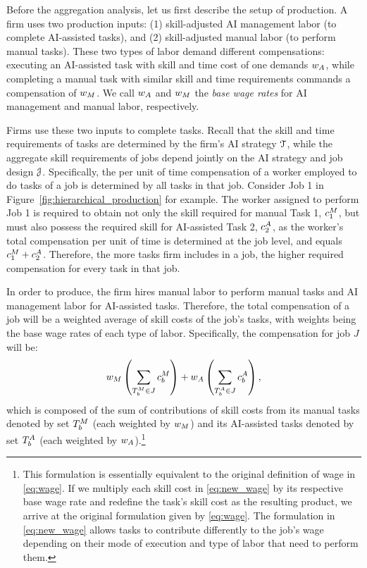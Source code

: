 Before the aggregation analysis, let us first describe the setup of production.
A firm uses two production inputs: (1) skill-adjusted AI management labor (to complete AI-assisted tasks), and (2) skill-adjusted manual labor (to perform manual tasks).
These two types of labor demand different compensations: executing an AI-assisted task with skill and time cost of one demands $w_{A}$, while completing a manual task with similar skill and time requirements commands a compensation of $w_{M}$.
We call $w_{A}$ and $w_{M}$ the \emph{base wage rates} for AI management and manual labor, respectively.

Firms use these two inputs to complete tasks.
Recall that the skill and time requirements of tasks are determined by the firm's AI strategy $\mathcal{T}$, while the aggregate skill requirements of jobs depend jointly on the AI strategy and job design $\mathcal{J}$.
Specifically, the per unit of time compensation of a worker employed to do tasks of a job is determined by all tasks in that job.
Consider Job 1 in Figure~\ref{fig:hierarchical_production} for example.
The worker assigned to perform Job 1 is required to obtain not only the skill required for manual Task 1, $c^{M}_{1}$, but must also possess the required skill for AI-assisted Task 2, $c^{A}_{2}$, as the worker's total compensation per unit of time is determined at the job level, and equals $c^{M}_{1} + c^{A}_{2}$.
Therefore, the more tasks firm includes in a job, the higher required compensation for every task in that job.

In order to produce, the firm hires manual labor to perform manual tasks and AI management labor for AI-assisted tasks.
Therefore, the total compensation of a job will be a weighted average of skill costs of the job's tasks, with weights being the base wage rates of each type of labor.
Specifically, the compensation for job $J$ will be:
\begin{equation}
w_{M} \left(\sum_{T_b^{M} \in J} c^{M}_{b}\right) + w_{A} \left(\sum_{T_b^{A} \in J} c^{A}_{b}\right),\label{eq:new_wage}
\end{equation}
which is composed of the sum of contributions of skill costs from its manual tasks denoted by set $T_b^{M}$ (each weighted by $w_{M}$) and its AI-assisted tasks denoted by set $T_b^{A}$ (each weighted by $w_{A}$).\footnote{
This formulation is essentially equivalent to the original definition of wage in \eqref{eq:wage}.
If we multiply each skill cost in \eqref{eq:new_wage} by its respective base wage rate and redefine the task's skill cost as the resulting product, we arrive at the original formulation given by \eqref{eq:wage}.
The formulation in \eqref{eq:new_wage} allows tasks to contribute differently to the job's wage depending on their mode of execution and type of labor that need to perform them.}

